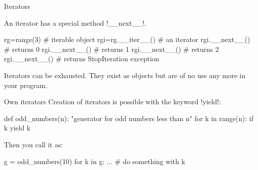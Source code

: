 \documentclass[hyperref={pdfpagelabels=false},table]{beamer}
\begin{document}
\begin{frame}[fragile]{Iterators }
\begin{defblock}
An iterator has a special method \pyth!__next__!.
\end{defblock}
\begin{example}
\begin{python}
rg=range(3)  # iterable object
rgi=rg.__iter__()  # an iterator
rgi.__next__()  # returns 0
rgi.__next__()  # returns 1
rgi.__next__()  # returns 2
rgi.__next__()  # returns StopIteration exception
\end{python}
\end{example}
Iterators can be exhausted. They exist as objects but are of no use any more
in your program.
\end{frame}
\begin{frame}[fragile]{Own iterators}
Creation of iterators is possible with the keyword \pyth!yield!:
\begin{python}
def odd_numbers(n):
  "generator for odd numbers less than n"
  for k in range(n):
    if k %
      yield k
\end{python}

Then you call it as:
\begin{python}
g = odd_numbers(10)
for k in g:
  ... # do something with k
\end{python}

\end{frame}
\end{document}
